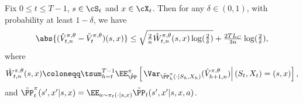 \documentclass[9pt]{article}
\numberwithin{equation}{section}
\begin{document}
\begin{lemma}\label{lemma_err_bernstein_eval}
\label{lemma_fin_mdp_pol_eval_berns_sum}
Fix $0 \leq t \leq T-1$,  $s \in \cS_t$ and $ x \in \cX_t$. Then for any $\delta \in (0,1)$, with probability at least $1-\delta$, we have
    \begin{align}
    \abs{(\hat{V}_{t,n}^{\pi, \theta} - \tilde{V}_t^{\pi, \theta})(s,x)} \leq \sqrt{\tfrac{2 }{n}\hat{W}_{t,n}^{\pi, \theta}(s,x) \log(\tfrac{2}{\delta})} + \tfrac{2  T L_C}{3n} \log(\tfrac{2}{\delta}), \nonumber
    \end{align}
    where
    \begin{align} 
    \hat{W}_{t,n}^{\pi, \theta}(s,x) \coloneqq  \tsum_{h = t}^{T-1} \EE_{\tilde \PP}^\pi \left[ \left. \Var_{\tilde{\PP}_h^\pi (\cdot|S_{h}, X_{h})} (\hat{V}_{h+1,n}^{\pi, \theta}) \right| (S_t, X_t) = (s,x) \right], 
    \label{fin_mdp_pol_eval_err_var_sum_decom}
    \end{align}
and $    \tilde{\PP}_t^\pi(s', x'|s,x) = \EE_{a \sim \pi_t(\cdot|s,x)} \tilde{\PP}_t( s', x'  | s, x, a)$.
\end{lemma}
\end{document}
